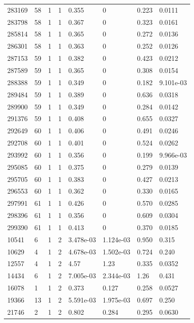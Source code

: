 \documentclass[preview]{standalone}
\begin{document}
{{{{{{{{{{{{{{{{{{{\begin{tabular}{L{1.2cm}C{1.2cm} C{0.3cm}C{0.5cm} C{1.4cm}C{1.4cm} C{1.4cm}C{1.4cm}}
  283169  &    58  & 1     &  1 &  0.355  & 0  & 0.223 &  0.0111   \\ 
  283798  &    58  & 1     &  1 &  0.367  & 0  & 0.323 &  0.0161   \\ 
  285814  &    58  & 1     &  1 &  0.365  & 0  & 0.272 &  0.0136   \\ 
  286301  &    58  & 1     &  1 &  0.363  & 0  & 0.252 &  0.0126   \\ 
  287153  &    59  & 1     &  1 &  0.382  & 0  & 0.423 &  0.0212   \\ 
  287589  &    59  & 1     &  1 &  0.365  & 0  & 0.308 &  0.0154   \\ 
  288388  &    59  & 1     &  1 &  0.349  & 0  & 0.182 &  9.101e-03   \\ 
  289484  &    59  & 1     &  1 &  0.389  & 0  & 0.636 &  0.0318   \\ 
  289900  &    59  & 1     &  1 &  0.349  & 0  & 0.284 &  0.0142   \\ 
  291376  &    59  & 1     &  1 &  0.408  & 0  & 0.655 &  0.0327   \\ 
  292649  &    60  & 1     &  1 &  0.406  & 0  & 0.491 &  0.0246   \\ 
  292708  &    60  & 1     &  1 &  0.401  & 0  & 0.524 &  0.0262   \\ 
  293992  &    60  & 1     &  1 &  0.356  & 0  & 0.199 &  9.966e-03   \\ 
  295085  &    60  & 1     &  1 &  0.375  & 0  & 0.279 &  0.0139   \\ 
  295705  &    60  & 1     &  1 &  0.383  & 0  & 0.427 &  0.0213   \\ 
  296553  &    60  & 1     &  1 &  0.362  & 0  & 0.330 &  0.0165   \\ 
  297991  &    61  & 1     &  1 &  0.426  & 0  & 0.570 &  0.0285   \\ 
  298396  &    61  & 1     &  1 &  0.356  & 0  & 0.609 &  0.0304   \\ 
  299390  &    61  & 1     &  1 &  0.413  & 0  & 0.370 &  0.0185   \\ 
  10541  &     6  & 1     &  2 &  3.478e-03  & 1.124e-03  & 0.950 &  0.315   \\ 
  10629  &     4  & 1     &  2 &  4.678e-03  & 1.502e-03  & 0.724 &  0.240   \\ 
  12557  &     4  & 1     &  2 &  4.57  & 1.23  & 0.335 &  0.0352   \\ 
  14434  &     6  & 1     &  2 &  7.005e-03  & 2.344e-03  & 1.26 &  0.431   \\ 
  16078  &     1  & 1     &  2 &  0.373  & 0.127  & 0.258 &  0.0527   \\ 
  19366  &    13  & 1     &  2 &  5.591e-03  & 1.975e-03  & 0.697 &  0.250   \\ 
  21746  &     2  & 1     &  2 &  0.802  & 0.284  & 0.295 &  0.0630   \\ 
\hline 
\end{tabular} 

}}}}}}}}}}}}}}}}}}}
\end{document}
